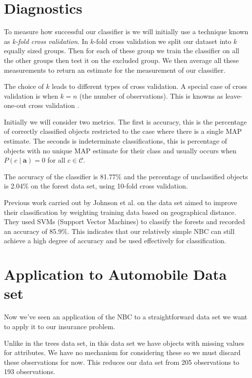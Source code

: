 \section{Diagnostics}

To measure how successful our classifier is we will initially use a technique known as \textit{k-fold cross validation}.
In $k$-fold cross validation we split our dataset into $k$ equally sized groups.
Then for each of these group we train the classifier on all the other groups then test it on the excluded group.
We then average all these measurements to return an estimate for the measurement of our classifier.

The choice of $k$ leads to different types of cross validation.
A special case of cross validation is when $k=n$ (the number of observations).
This is knowns as leave-one-out cross validation \cite{Priddy05}.

Initially we will consider two metrics.
The first is accuracy, this is the percentage of correctly classified objects restricted to the case where there is a single MAP estimate.
The seconds is indeterminate classifications, this is percentage of objects with no unique MAP estimate for their class and usually occurs when $P(c \mid \mathbf{a}) = 0$ for all $c \in \mathcal{C}$.

The accuracy of the classifier is 81.77\% and the percentage of unclassified objects is 2.04\% on the forest data set, using 10-fold cross validation.

Previous work carried out by Johnson et al. \cite{Johnson12} on the data set aimed to improve their classification by weighting training data based on geographical distance.
They used SVMs (Support Vector Machines) to classify the forests and recorded an accuracy of 85.9\%.
This indicates that our relatively simple NBC can still achieve a high degree of accuracy and be used effectively for classification.

\section{Application to Automobile Data set}

Now we've seen an application of the NBC to a straightforward data set we want to apply it to our insurance problem.

Unlike in the trees data set, in this data set we have objects with missing values for attributes.
We have no mechanism for considering these so we must discard these observations for now.
This reduces our data set from 205 observations to 193 observations.

